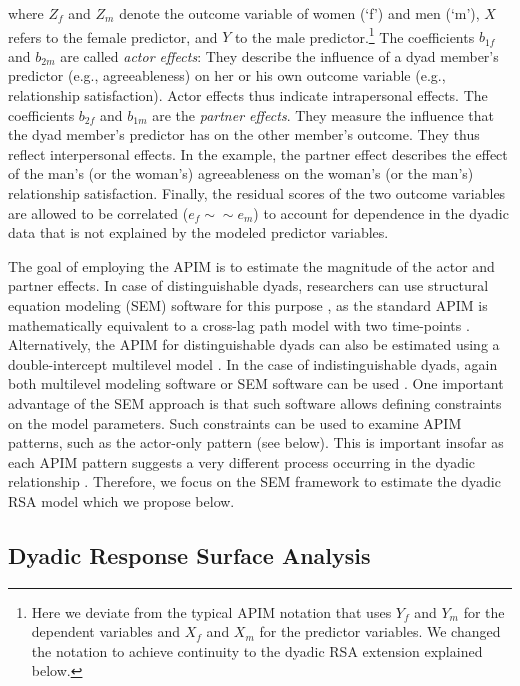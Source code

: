 \documentclass[jou,a4paper,draftfirst]{apa6}
\begin{document}
where $Z_f$ and $Z_m$ denote the outcome variable of women (‘f’) and men (‘m’), $X$ refers to the female predictor, and $Y$ to the male predictor.\footnote{Here we deviate from the typical APIM notation that uses $Y_f$ and $Y_m$ for the dependent variables and $X_f$ and $X_m$ for the predictor variables. We changed the notation to achieve continuity to the dyadic RSA extension explained below.} The coefficients $b_{1f}$ and $b_{2m}$ are called \textit{actor effects}: They describe the influence of a dyad member’s predictor (e.g., agreeableness) on her or his own outcome variable (e.g., relationship satisfaction). Actor effects thus indicate intrapersonal effects. The coefficients $b_{2f}$ and $b_{1m}$ are the \textit{partner effects}. They measure the influence that the dyad member’s predictor has on the other member’s outcome. They thus reflect interpersonal effects. In the example, the partner effect describes the effect of the man’s (or the woman’s) agreeableness on the woman’s (or the man’s) relationship satisfaction. Finally, the residual scores of the two outcome variables are allowed to be correlated ($e_f \sim\sim e_m$) to account for dependence in the dyadic data that is not explained by the modeled predictor variables.

The goal of employing the APIM is to estimate the magnitude of the actor and partner effects. In case of distinguishable dyads, researchers can use structural equation modeling (SEM) software for this purpose \parencite{kenny_dyadic_2006}, as the standard APIM is mathematically equivalent to a cross-lag path model with two time-points \parencite{NestlerEtAl2015}. 
Alternatively, the APIM for distinguishable dyads can also be estimated using a double-intercept multilevel model \parencite{kenny_dyadic_2006}. In the case of indistinguishable dyads, again both multilevel modeling software or SEM software can be used \parencite[see][]{kenny_dyadic_2006,olsen_structural_2006}. One important advantage of the SEM approach is that such software allows defining constraints on the model parameters. Such constraints can be used to examine APIM patterns, such as the actor-only pattern (see below). This is important insofar as each APIM pattern suggests a very different process occurring in the dyadic relationship \parencite[see][]{KennyLedermann2010}. Therefore, we focus on the SEM framework to estimate the dyadic RSA model which we propose below.


\subsection{Dyadic Response Surface Analysis}
\end{document}
